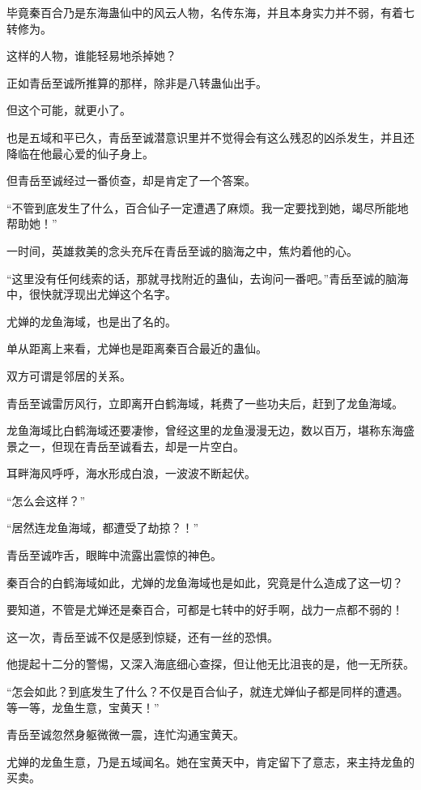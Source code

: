 \begin{this_body}
毕竟秦百合乃是东海蛊仙中的风云人物，名传东海，并且本身实力并不弱，有着七转修为。

这样的人物，谁能轻易地杀掉她？

正如青岳至诚所推算的那样，除非是八转蛊仙出手。

但这个可能，就更小了。

也是五域和平已久，青岳至诚潜意识里并不觉得会有这么残忍的凶杀发生，并且还降临在他最心爱的仙子身上。

但青岳至诚经过一番侦查，却是肯定了一个答案。

“不管到底发生了什么，百合仙子一定遭遇了麻烦。我一定要找到她，竭尽所能地帮助她！”

一时间，英雄救美的念头充斥在青岳至诚的脑海之中，焦灼着他的心。

“这里没有任何线索的话，那就寻找附近的蛊仙，去询问一番吧。”青岳至诚的脑海中，很快就浮现出尤婵这个名字。

尤婵的龙鱼海域，也是出了名的。

单从距离上来看，尤婵也是距离秦百合最近的蛊仙。

双方可谓是邻居的关系。

青岳至诚雷厉风行，立即离开白鹤海域，耗费了一些功夫后，赶到了龙鱼海域。

龙鱼海域比白鹤海域还要凄惨，曾经这里的龙鱼漫漫无边，数以百万，堪称东海盛景之一，但现在青岳至诚看去，却是一片空白。

耳畔海风呼呼，海水形成白浪，一波波不断起伏。

“怎么会这样？”

“居然连龙鱼海域，都遭受了劫掠？！”

青岳至诚咋舌，眼眸中流露出震惊的神色。

秦百合的白鹤海域如此，尤婵的龙鱼海域也是如此，究竟是什么造成了这一切？

要知道，不管是尤婵还是秦百合，可都是七转中的好手啊，战力一点都不弱的！

这一次，青岳至诚不仅是感到惊疑，还有一丝的恐惧。

他提起十二分的警惕，又深入海底细心查探，但让他无比沮丧的是，他一无所获。

“怎会如此？到底发生了什么？不仅是百合仙子，就连尤婵仙子都是同样的遭遇。等一等，龙鱼生意，宝黄天！”

青岳至诚忽然身躯微微一震，连忙沟通宝黄天。

尤婵的龙鱼生意，乃是五域闻名。她在宝黄天中，肯定留下了意志，来主持龙鱼的买卖。


\end{this_body}
